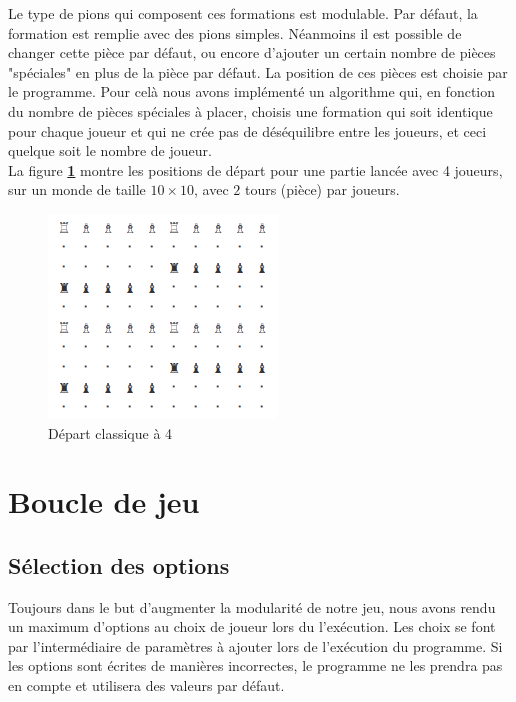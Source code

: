             Le type de pions qui composent ces formations est modulable. Par défaut, la formation est remplie avec des pions simples. Néanmoins il est possible de changer cette pièce par défaut, ou encore d'ajouter un certain nombre de pièces "spéciales" en plus de la pièce par défaut. La position de ces pièces est choisie par le programme. Pour celà nous avons implémenté un algorithme qui, en fonction du nombre de pièces spéciales à placer, choisis une formation qui soit identique pour chaque joueur et qui ne crée pas de déséquilibre entre les joueurs, et ceci quelque soit le nombre de joueur. \\
            La figure \textbf{\ref{fig:depart_classique_a_4}} montre les positions de départ pour une partie lancée avec 4 joueurs, sur un monde de taille $10\times10$, avec  $2$ tours (pièce) par joueurs.
            
            \begin{figure}[H]
                \centering
                \includegraphics[scale=0.6]{img/depart_classique_a_4.png}
                \caption{Départ classique à 4}
                \label{fig:depart_classique_a_4}
            \end{figure}
            
    \section{Boucle de jeu}

        \subsection{Sélection des options}
            Toujours dans le but d'augmenter la modularité de notre jeu, nous avons rendu un maximum d'options au choix de joueur lors du l'exécution. Les choix se font par l'intermédiaire de paramètres à ajouter lors de l'exécution du programme. Si les options sont écrites de manières incorrectes, le programme ne les prendra pas en compte et utilisera des valeurs par défaut.
            
